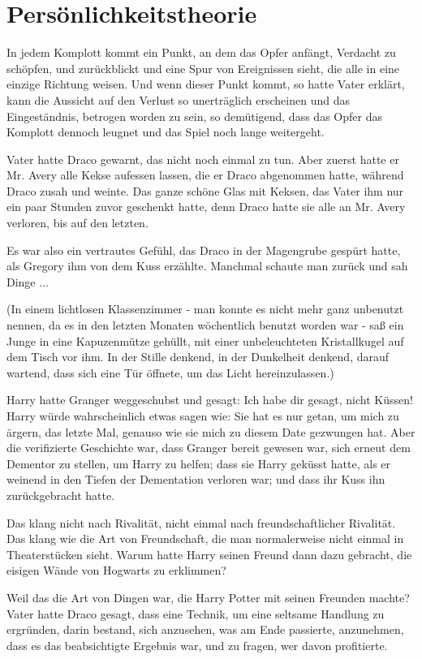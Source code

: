 \chapter{Persönlichkeitstheorie}

In jedem Komplott kommt ein Punkt, an dem das Opfer anfängt, Verdacht zu
schöpfen, und zurückblickt und eine Spur von Ereignissen sieht, die alle in eine
einzige Richtung weisen. Und wenn dieser Punkt kommt, so hatte Vater erklärt,
kann die Aussicht auf den Verlust so unerträglich erscheinen und das
Eingeständnis, betrogen worden zu sein, so demütigend, dass das Opfer das
Komplott dennoch leugnet und das Spiel noch lange weitergeht.

Vater hatte Draco gewarnt, das nicht noch einmal zu tun. Aber zuerst hatte er
Mr. Avery alle Kekse aufessen lassen, die er Draco abgenommen hatte, während
Draco zusah und weinte. Das ganze schöne Glas mit Keksen, das Vater ihm nur ein
paar Stunden zuvor geschenkt hatte, denn Draco hatte sie alle an Mr. Avery
verloren, bis auf den letzten.

Es war also ein vertrautes Gefühl, das Draco in der Magengrube gespürt hatte,
als Gregory ihm von dem Kuss erzählte. Manchmal schaute man zurück und sah
Dinge ...

(In einem lichtlosen Klassenzimmer - man konnte es nicht mehr ganz unbenutzt
nennen, da es in den letzten Monaten wöchentlich benutzt worden war - saß ein
Junge in eine Kapuzenmütze gehüllt, mit einer unbeleuchteten Kristallkugel auf
dem Tisch vor ihm. In der Stille denkend, in der Dunkelheit denkend, darauf
wartend, dass sich eine Tür öffnete, um das Licht hereinzulassen.)

Harry hatte Granger weggeschubst und gesagt: Ich habe dir gesagt, nicht Küssen!
Harry würde wahrscheinlich etwas sagen wie: Sie hat es nur getan, um mich zu
ärgern, das letzte Mal, genauso wie sie mich zu diesem Date gezwungen hat. Aber
die verifizierte Geschichte war, dass Granger bereit gewesen war, sich erneut
dem Dementor zu stellen, um Harry zu helfen; dass sie Harry geküsst hatte, als
er weinend in den Tiefen der Dementation verloren war; und dass ihr Kuss ihn
zurückgebracht hatte.

Das klang nicht nach Rivalität, nicht einmal nach freundschaftlicher Rivalität.
Das klang wie die Art von Freundschaft, die man normalerweise nicht einmal in
Theaterstücken sieht. Warum hatte Harry seinen Freund dann dazu gebracht, die
eisigen Wände von Hogwarts zu erklimmen?

Weil das die Art von Dingen war, die Harry Potter mit seinen Freunden machte?
Vater hatte Draco gesagt, dass eine Technik, um eine seltsame Handlung zu
ergründen, darin bestand, sich anzusehen, was am Ende passierte, anzunehmen,
dass es das beabsichtigte Ergebnis war, und zu fragen, wer davon profitierte.

